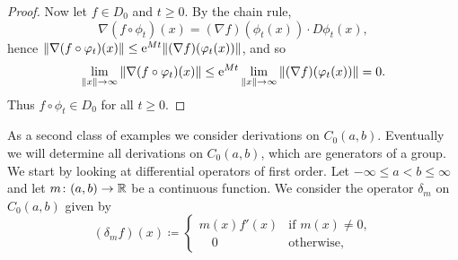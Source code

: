\begin{proof}
Now let $f \in D_{0}$ and $t \geq 0$. By the chain rule,
\[
    \nabla(f \circ \phi_{t})(x) = (\nabla f)(\phi_{t}(x)) \cdot D\phi_{t}(x),
\]
hence $\|\nabla(f \circ \phi_{t})(x)\| \leq \eu^{Mt}\|(\nabla f)(\phi_{t}(x))\|$, and so
\[
    \lim_{\|x\| \to \infty} \|\nabla(f \circ \phi_{t})(x)\|
    \leq \eu^{Mt} \lim_{\|x\| \to \infty} \|(\nabla f)(\phi_{t}(x))\| = 0.
\]
Thus $f \circ \phi_{t} \in D_{0}$ for all $t \geq 0$.
\end{proof}
As a second class of examples we consider derivations on $C_{0}(a,b)$.
Eventually we will determine all derivations on $C_{0}(a,b)$, which are generators of a group.
We start by looking at differential operators of first order.
Let $-\infty \leq a < b \leq \infty$ and let $m \colon (a,b) \to \mathbb{R}$ be a continuous function.
We consider the operator $\delta_{m}$ on $C_{0}(a,b)$ given by
\begin{equation*}\label{eq:b2-delta-m}
(\delta_{m}f)(x) \coloneq \begin{cases}
    m(x)f'(x) & \text{if } m(x) \neq 0 , \\
    \quad 0 & \text{otherwise} ,
\end{cases}
\end{equation*}

